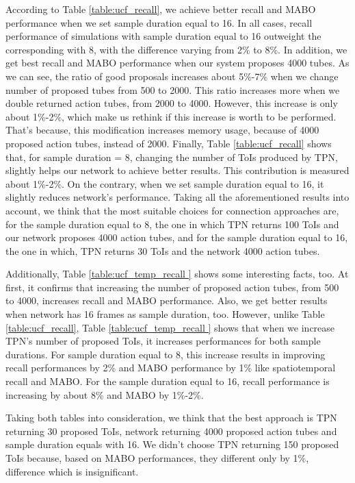 According to Table \ref{table:ucf_recall}, we achieve better recall and MABO performance when we set sample duration equal to 16.
In all cases,  recall performance of simulations with sample duration equal to  16 outweight the corresponding with 8, with the difference
varying from 2\% to 8\%. In addition, we get best recall and MABO performance when our system proposes 4000 tubes. As we can see,
the ratio of good proposals increases about 5\%-7\% when we change number of proposed tubes from 500 to 2000. This ratio increases more
when we double returned action tubes, from 2000 to 4000. However, this increase is only about 1\%-2\%, which make us rethink if this increase
is worth to be performed. That's because, this modification increases memory usage, because of 4000 proposed action tubes, instead of
2000. Finally, Table \ref{table:ucf_recall} shows that, for sample duration = 8, changing the number of ToIs produced by TPN, slightly
helps our network to achieve better results. This contribution is measured about 1\%-2\%.
On the contrary, when we set sample duration equal to 16, it slightly reduces network's performance. Taking all the aforementioned
results into account, we think that the most suitable choices for connection approaches are, for the sample duration equal to 8, the one in
which TPN returns 100 ToIs and our network proposes 4000 action tubes, and for the sample duration equal to 16, the one in which,
TPN returns 30 ToIs and the network 4000 action tubes. \par
Additionally, Table \ref{table:ucf_temp_recall } shows some interesting facts, too. At first, it confirms that increasing the number of proposed
action tubes, from 500 to 4000, increases recall and MABO performance. Also, we get better results when network has 16 frames as sample
duration, too. However, unlike Table \ref{table:ucf_recall}, Table \ref{table:ucf_temp_recall } shows that when we increase TPN's number
of proposed ToIs, it increases performances for both sample durations. For sample duration equal to 8, this increase results in improving
recall performances by 2\% and MABO performance by 1\% like spatiotemporal recall and MABO. For the sample duration equal to 16, recall
performance is increasing by about 8\% and MABO by 1\%-2\%.  \par
Taking both tables into consideration, we think that the best approach is TPN returning 30 proposed ToIs, network returning 4000 proposed
action tubes and sample duration equals with 16. We didn't choose TPN returning 150 proposed ToIs because, based on MABO performances,
they different only by 1\%, difference which is insignificant.


